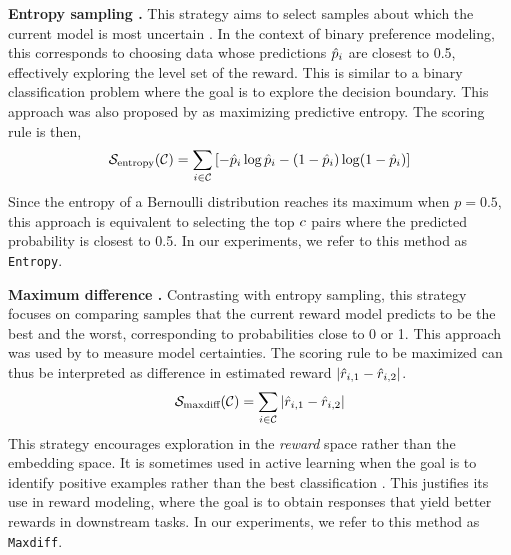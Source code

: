 \textbf{Entropy sampling \citep{settles2009active, muldrew2024active}.}
This strategy aims to select samples about which the current model is most uncertain \citep{settles2009active}. In the context of binary preference modeling, this corresponds to choosing data whose predictions $\hat{p}_{i}$ are closest to 0.5, effectively exploring the level set of the reward. This is similar to a binary classification problem where the goal is to explore the decision boundary. This approach was also proposed by \citet{muldrew2024active} as maximizing predictive entropy. The scoring rule is then,
\begin{equation}
    \mathcal{S}_{\text{entropy}}(\mathcal{C})=\sum_{i\in \mathcal{C}} \left[-\hat{p}_{i}\log \hat{p}_{i} -(1-\hat{p}_{i})\log(1-\hat{p}_{i})\right]
\end{equation}
Since the entropy of a Bernoulli distribution reaches its maximum when $p = 0.5$, this approach is equivalent to selecting the top $c$ pairs where the predicted probability is closest to 0.5. In our experiments, we refer to this method as \texttt{Entropy}.

\textbf{Maximum difference \citep{muldrew2024active}.}
Contrasting with entropy sampling, this strategy focuses on comparing samples that the current reward model predicts to be the best and the worst, corresponding to probabilities close to 0 or 1. This approach was used by \citet{muldrew2024active} to measure model certainties. The scoring rule to be maximized can thus be interpreted as difference in estimated reward $|\hat{r}_{i,1}-\hat{r}_{i,2}|$.
\begin{equation}
    \scoringrule_{\maxdiff}(\chosenset)=\sum_{\pairidx\in \chosenset} |\hat{\truereward}_{\pairidx,1}-\hat{\truereward}_{\pairidx,2}|%
\end{equation}
This strategy encourages exploration in the \textit{reward} space rather than the embedding space. It is sometimes used in active learning when the goal is to identify positive examples rather than the best classification \citep{settles2009active}. This justifies its use in reward modeling, where the goal is to obtain responses that yield better rewards in downstream tasks. In our experiments, we refer to this method as \texttt{Maxdiff}.

